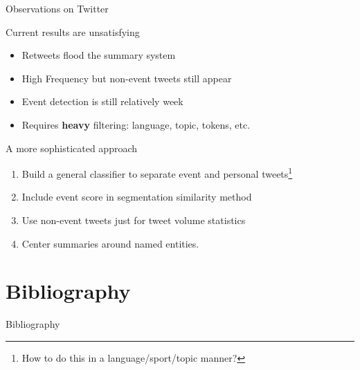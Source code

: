 \documentclass[compress]{beamer}
\begin{document}
\begin{frame}{Observations on Twitter}

\begin{block}{Current results are unsatisfying}
\begin{itemize}
\item Retweets flood the summary system
\item High Frequency but non-event tweets still appear
\item Event detection is still relatively week
\item Requires \textbf{heavy} filtering: language, topic, tokens, etc.
\end{itemize}
\end{block}

\pause

\begin{block}{A more sophisticated approach}
\begin{enumerate}
\item Build a general classifier to separate event and personal tweets\footnote{
How to do this in a language/sport/topic manner?}
\item Include event score in segmentation similarity method
\item Use non-event tweets just for tweet volume statistics
\item Center summaries around named entities.
\end{enumerate}
\end{block}
\end{frame}


\section{Bibliography}

\begin{frame}{Bibliography}
\tiny


\end{frame}
\end{document}
